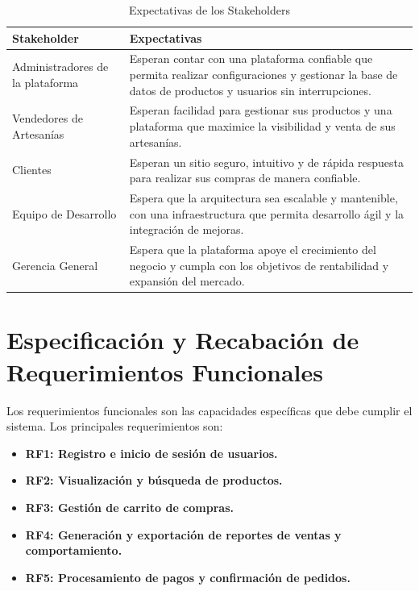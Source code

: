 \documentclass[12pt]{article}
\begin{document}
\begin{table}[H]
    \centering
    \begin{tabular}{|p{8cm}|p{8cm}|}
        \hline
        \textbf{Stakeholder} & \textbf{Expectativas} \\ \hline
        Administradores de la plataforma & Esperan contar con una plataforma confiable que permita realizar configuraciones y gestionar la base de datos de productos y usuarios sin interrupciones. \\ \hline
        Vendedores de Artesanías & Esperan facilidad para gestionar sus productos y una plataforma que maximice la visibilidad y venta de sus artesanías. \\ \hline
        Clientes & Esperan un sitio seguro, intuitivo y de rápida respuesta para realizar sus compras de manera confiable. \\ \hline
        Equipo de Desarrollo & Espera que la arquitectura sea escalable y mantenible, con una infraestructura que permita desarrollo ágil y la integración de mejoras. \\ \hline
        Gerencia General & Espera que la plataforma apoye el crecimiento del negocio y cumpla con los objetivos de rentabilidad y expansión del mercado. \\ \hline
    \end{tabular}
    \caption{Expectativas de los Stakeholders}
    \label{tab:expectativas_stakeholders}
\end{table}


\section{Especificación y Recabación de Requerimientos Funcionales}
Los requerimientos funcionales son las capacidades específicas que debe cumplir el sistema. Los principales requerimientos son:

\begin{itemize}
    \item \textbf{RF1: Registro e inicio de sesión de usuarios.}
    \item \textbf{RF2: Visualización y búsqueda de productos.}
    \item \textbf{RF3: Gestión de carrito de compras.}
    \item \textbf{RF4: Generación y exportación de reportes de ventas y comportamiento.}
    \item \textbf{RF5: Procesamiento de pagos y confirmación de pedidos.}
\end{itemize}
\end{document}
